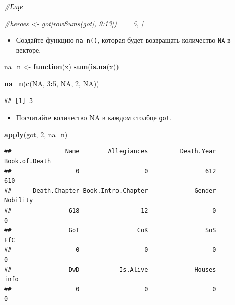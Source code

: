 \documentclass[]{book}
\newenvironment{Shaded}{\begin{snugshade}}{\end{snugshade}}
\newcommand{\KeywordTok}[1]{\textcolor[rgb]{0.13,0.29,0.53}{\textbf{#1}}}
\newcommand{\DecValTok}[1]{\textcolor[rgb]{0.00,0.00,0.81}{#1}}
\newcommand{\StringTok}[1]{\textcolor[rgb]{0.31,0.60,0.02}{#1}}
\newcommand{\CommentTok}[1]{\textcolor[rgb]{0.56,0.35,0.01}{\textit{#1}}}
\newcommand{\OtherTok}[1]{\textcolor[rgb]{0.56,0.35,0.01}{#1}}
\newcommand{\ControlFlowTok}[1]{\textcolor[rgb]{0.13,0.29,0.53}{\textbf{#1}}}
\newcommand{\OperatorTok}[1]{\textcolor[rgb]{0.81,0.36,0.00}{\textbf{#1}}}
\newcommand{\NormalTok}[1]{#1}
\providecommand{\tightlist}{%
  \setlength{\itemsep}{0pt}\setlength{\parskip}{0pt}}
\begin{document}
\begin{Shaded}
\begin{Highlighting}[]
\CommentTok{#Еще}

\CommentTok{#heroes <- got[rowSums(got[, 9:13]) == 5, ]}
\end{Highlighting}
\end{Shaded}

\begin{itemize}
\tightlist
\item
  Создайте функцию \texttt{na\_n()}, которая будет возвращать количество
  \texttt{NA} в векторе.
\end{itemize}

\begin{Shaded}
\begin{Highlighting}[]
\NormalTok{na_n <-}\StringTok{ }\ControlFlowTok{function}\NormalTok{(x) }\KeywordTok{sum}\NormalTok{(}\KeywordTok{is.na}\NormalTok{(x))}
\end{Highlighting}
\end{Shaded}

\begin{Shaded}
\begin{Highlighting}[]
\KeywordTok{na_n}\NormalTok{(}\KeywordTok{c}\NormalTok{(}\OtherTok{NA}\NormalTok{, }\DecValTok{3}\OperatorTok{:}\DecValTok{5}\NormalTok{, }\OtherTok{NA}\NormalTok{, }\DecValTok{2}\NormalTok{, }\OtherTok{NA}\NormalTok{))}
\end{Highlighting}
\end{Shaded}

\begin{verbatim}
## [1] 3
\end{verbatim}

\begin{itemize}
\tightlist
\item
  Посчитайте количество NA в каждом столбце \texttt{got}.
\end{itemize}

\begin{Shaded}
\begin{Highlighting}[]
\KeywordTok{apply}\NormalTok{(got, }\DecValTok{2}\NormalTok{, na_n)}
\end{Highlighting}
\end{Shaded}

\begin{verbatim}
##               Name        Allegiances         Death.Year      Book.of.Death 
##                  0                  0                612                610 
##      Death.Chapter Book.Intro.Chapter             Gender           Nobility 
##                618                 12                  0                  0 
##                GoT                CoK                SoS                FfC 
##                  0                  0                  0                  0 
##                DwD           Is.Alive             Houses               info 
##                  0                  0                  0                  0
\end{verbatim}
\end{document}
